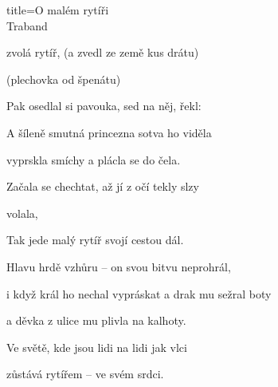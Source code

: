 \begin{song}{title=\predtitle \centering O malém rytíři \\\large Traband }
\begin{centerjustified}

\sloka
{} zvolá rytíř,  (a zvedl ze země kus drátu)

 (plechovka od špenátu)

Pak osedlal si pavouka, sed na něj, řekl: 



\sloka
A šíleně smutná princezna sotva ho viděla

vyprskla smíchy a plácla se do čela.

Začala se chechtat, až jí z očí tekly slzy

 volala, 



\sloka
Tak jede malý rytíř svojí cestou dál.

Hlavu hrdě vzhůru -- on svou bitvu neprohrál,

i když král ho nechal vypráskat a drak mu sežral boty

a děvka z ulice mu plivla na kalhoty.

Ve světě, kde jsou lidi na lidi jak vlci

zůstává rytířem -- ve svém srdci.



\end{centerjustified}
\setcounter{Slokočet}{0}
\end{song}
